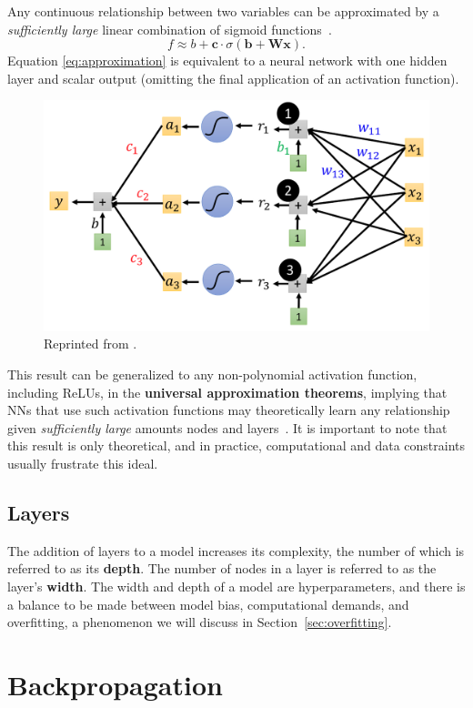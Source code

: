 \documentclass[12pt]{report}
\theoremstyle{definition}
\theoremstyle{remark}
\begin{document}
Any continuous relationship between two variables can be approximated by a \textit{sufficiently large} linear combination of sigmoid functions~\cite{cybenko_approximation_1989}.
\begin{equation} \label{eq:approximation}
    f \approx b + \mathbf{c} \cdot \sigma(\mathbf{b} + \mathbf{W}\mathbf{x}).
\end{equation}
Equation \ref{eq:approximation} is equivalent to a neural network with one hidden layer and scalar output (omitting the final application of an activation function).
\begin{figure}[h]
    \centering
    \includegraphics[width=0.5\linewidth]{figs/simple.png}
    \caption{Reprinted from \cite{lee_introduction_2021}.}
    \label{fig:enter-label}
\end{figure}

This result can be generalized to any non-polynomial activation function, including ReLUs, in the \textbf{universal approximation theorems}, implying that NNs that use such activation functions may theoretically learn any relationship given \textit{sufficiently large} amounts nodes and layers~\cite{hornik_multilayer_1989, kidger_universal_2020, pinkus_approximation_1999}. It is important to note that this result is only theoretical, and in practice, computational and data constraints usually frustrate this ideal.

\subsection{Layers}

The addition of layers to a model increases its complexity, the number of which is referred to as its \textbf{depth}. The number of nodes in a layer is referred to as the layer's \textbf{width}. The width and depth of a model are hyperparameters, and there is a balance to be made between model bias, computational demands, and overfitting, a phenomenon we will discuss in Section~\ref{sec:overfitting}.
\section{Backpropagation}
\end{document}
